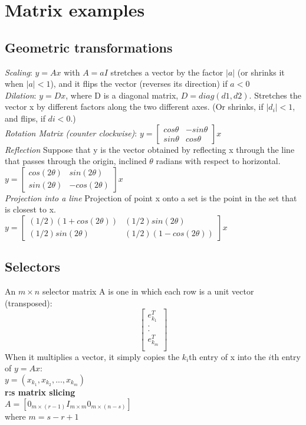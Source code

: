 \section{Matrix examples}
\subsection{Geometric transformations}
\textbullet \textit{Scaling}: $y = Ax$ with $A = aI$ stretches a vector by the factor $|a|$ (or shrinks it when $|a| < 1$), and it flips the vector (reverses its direction) if $a < 0$\\
\textbullet \textit{Dilation}: $y = Dx$, where D is a diagonal matrix, $D = diag(d1,d2)$. Stretches the vector x by different factors along the two different axes. (Or shrinks, if $|d_i| < 1$, and flips, if $di < 0$.)\\
\textbullet \textit{Rotation Matrix (counter clockwise)}: 
$
y = 
\begin{bmatrix}
    cos \theta & -sin \theta \\
    sin \theta & cos \theta
\end{bmatrix}x
$\\
\textbullet \textit{Reflection}
Suppose that y is the vector obtained by reflecting x through the line that passes through the origin, inclined $\theta$ radians with respect to horizontal.\\
$
y = 
\begin{bmatrix}
    cos (2\theta) & sin(2\theta) \\
    sin (2\theta) & -cos (2\theta)
\end{bmatrix}x
$\\
\textbullet \textit{Projection into a line}
Projection of point x onto a set is the point in the set that is closest to x.\\
$
y = 
\begin{bmatrix}
    (1/2)(1 + cos (2\theta)) & (1/2)sin(2\theta) \\
    (1/2)sin (2\theta) & (1/2)(1 - cos (2\theta))
\end{bmatrix}x
$
\subsection{Selectors}
An $m \times n$ selector matrix A is one in which each row is a unit vector (transposed):
\[
\begin{bmatrix}
    e^T_{k_1}\\
    .\\
    .\\
    e^T_{k_m}\\
\end{bmatrix}
\]
When it multiplies a vector, it simply copies the $k_i$th entry of x into the $i$th entry of $y = Ax$:\\
$y = (x_{k_1},x_{k_2},...,x_{k_m})$\\
\textbf{r:s matrix slicing}\\
$A=[0_{m\times(r-1)} I_{m\times m} 0_{m \times (n-s)}]$\\
where $m=s-r+1$
